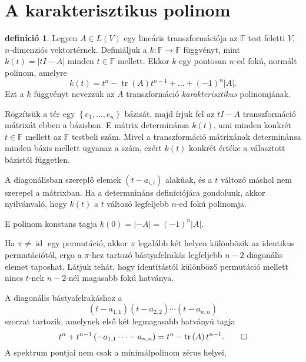 \documentclass[9pt, a4paper, showtrims]{memoir}
\makeatletter
\renewenvironment{proof}[1][\proofname]
    {\par\pushQED{\qed}%
    \normalfont \topsep6\p@\@plus6\p@\relax
    \trivlist
    \item[\hskip\labelsep
        \itshape
    #1\@addpunct{:}]\ignorespaces}
    {\popQED\endtrivlist\@endpefalse}
\theoremstyle{plain}
\theoremstyle{remark}
\theoremstyle{definition}
\newtheorem{definition}[proposition]{definíció}
\DeclareMathOperator{\tr}{tr}
\DeclareMathOperator{\id}{id}
\makeatother
\begin{document}
\section{A karakterisztikus polinom}
\begin{definition}
    Legyen $A\in L\left( V \right)$ egy lineáris transzformációja az $\mathbb{F}$ test feletti $V$,
    $n$-dimenziós vektortérnek.
    Definiáljuk a $k:\mathbb{F}\to\mathbb{F}$ függvényt, mint
    $k\left( t \right)=|tI-A|$ minden $t\in\mathbb{F}$ mellett.
    Ekkor $k$ egy pontosan $n$-ed fokú, normált polinom,
    amelyre
    \[
        k\left( t \right)
        =
        t^n-\tr(A)t^{n-1}+\dots+\left( -1 \right)^n|A|.
    \]
    Ezt a $k$ függvényt nevezzük az 
    $A$ transzformáció \emph{karakterisztikus}
    polinomjának.
\end{definition}
\begin{proof}
    Rögzítsük a tér egy $\left\{ e_1,\dots,e_n \right\}$ bázisát,
    majd írjuk fel az $tI-A$ transzformáció mátrixát ebben a bázisban.
    E mátrix determinánsa $k\left( t \right)$, 
    ami minden konkrét $t\in\mathbb{F}$ mellett az $\mathbb{F}$ testbeli szám.
    Mivel a transzformáció mátrixának determinánsa minden bázis mellett ugyanaz a szám,
    ezért $k\left( t \right)$ konkrét értéke a választott bázistól független.

    A diagonálisban szereplő elemek $\left( t-a_{i,i} \right)$ alakúak, 
    és a $t$ változó máshol nem szerepel a mátrixban.
    Ha a determnináns definíciójára gondolunk, akkor nyilvánvaló, hogy $k\left( t \right)$ a $t$
    változó legfeljebb $n$-ed fokú polinomja.

    E polinom konstans tagja $k\left( 0 \right)=|-A|=\left( -1 \right)^n|A|.$

    Ha $\pi\neq\id$ egy permutáció, 
    akkor $\pi$ legalább két helyen különbözik az identikus permutációtól,
    ergo a $\pi$-hez tartozó bástyafelrakás legfeljebb $n-2$ diagonális elemet taposhat.
    Látjuk tehát, 
    hogy identitástól különböző permutáció mellett nincs $t$-nek $n-2$-nél magasabb fokú hatványa.

    A diagonális bástyafelrakáshoz a 
    \[
        \left( t-a_{1,1} \right)\left( t-a_{2,2} \right)\cdots\left( t-a_{n,n} \right)
    \]
    szorzat tartozik, amelynek első két legmagasabb hatványú tagja
    \[
        t^n+t^{n-1}\left( -a_{1,1}\dots-a_{n,n} \right)=t^n-\tr\left( A \right)t^{n-1}.\qedhere
    \]
\end{proof}
A spektrum pontjai nem csak a minimálpolinom zérus helyei, 
\end{document}
